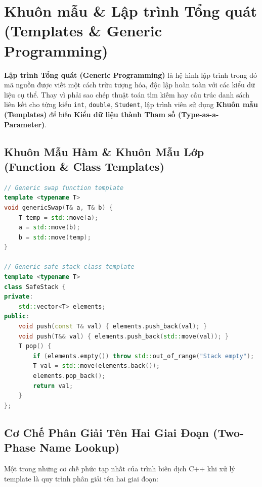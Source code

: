 \documentclass[12pt,a4paper,oneside]{book}
\begin{document}
\chapter{Khuôn mẫu \& Lập trình Tổng quát (Templates \& Generic Programming)}

\begin{theorybox}
\textbf{Lập trình Tổng quát (Generic Programming)} là hệ hình lập trình trong đó mã nguồn được viết một cách trừu tượng hóa, độc lập hoàn toàn với các kiểu dữ liệu cụ thể. Thay vì phải sao chép thuật toán tìm kiếm hay cấu trúc danh sách liên kết cho từng kiểu \texttt{int}, \texttt{double}, \texttt{Student}, lập trình viên sử dụng \textbf{Khuôn mẫu (Templates)} để biến \textbf{Kiểu dữ liệu thành Tham số (Type-as-a-Parameter)}.
\end{theorybox}

\section{Khuôn Mẫu Hàm \& Khuôn Mẫu Lớp (Function \& Class Templates)}

\begin{lstlisting}[language=C++]
// Generic swap function template
template <typename T>
void genericSwap(T& a, T& b) {
    T temp = std::move(a);
    a = std::move(b);
    b = std::move(temp);
}

// Generic safe stack class template
template <typename T>
class SafeStack {
private:
    std::vector<T> elements;
public:
    void push(const T& val) { elements.push_back(val); }
    void push(T&& val) { elements.push_back(std::move(val)); }
    T pop() {
        if (elements.empty()) throw std::out_of_range("Stack empty");
        T val = std::move(elements.back());
        elements.pop_back();
        return val;
    }
};
\end{lstlisting}

\section{Cơ Chế Phân Giải Tên Hai Giai Đoạn (Two-Phase Name Lookup)}

Một trong những cơ chế phức tạp nhất của trình biên dịch C++ khi xử lý template là quy trình phân giải tên hai giai đoạn:
\end{document}
